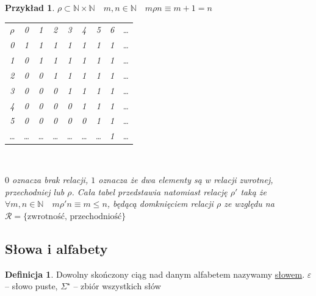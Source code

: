 \documentclass[12pt,a4paper]{article}
\newtheorem{przyklad}{Przykład}
\theoremstyle{definition}
\newtheorem{df}{Definicja}
\theoremstyle{remark}
\begin{document}
\begin{przyklad}
	$\rho \subset \mathbb{N}\times\mathbb{N} \quad m,n \in \mathbb{N} \quad m\rho n \equiv m +1 = n$ \\
	\begin{center}
	\begin{tabular}{ccccccccc}
		$\rho$ & 0 & 1 & 2 & 3 & 4 & 5 & 6 & \dots \\
			0  & {\color{red}1} & {\color{blue}1} & {\color{green}1}  & {\color{green}1}  & {\color{green}1}  & {\color{green}1}  & {\color{green}1}  & \dots \\
			1  & {\color{yellow}0}  & {\color{red}1}  & {\color{blue}1} & {\color{green}1}  & {\color{green}1}  & {\color{green}1}  & {\color{green}1}  & \dots \\
			2  & {\color{yellow}0}  & {\color{yellow}0}  & {\color{red}1}  & {\color{blue}1} & {\color{green}1}  &  {\color{green}1} & {\color{green}1}  & \dots \\
			3  & {\color{yellow}0}  & {\color{yellow}0}  & {\color{yellow}0}  & {\color{red}1}  & {\color{blue}1} & {\color{green}1}  & {\color{green}1}  & \dots \\
			4  & {\color{yellow}0}  & {\color{yellow}0}  & {\color{yellow}0}  & {\color{yellow}0}  & {\color{red}1}  & {\color{blue}1} & {\color{green}1}  & \dots \\
			5  & {\color{yellow}0}  & {\color{yellow}0}  & {\color{yellow}0}  & {\color{yellow}0}  & {\color{yellow}0}  & {\color{red}1}  & {\color{blue}1} & \dots \\
	     \dots & \dots  & \dots  & \dots  & \dots  & \dots  & \dots  & {\color{red}1}  & \dots \\
	\end{tabular}\\
	\end{center}	
	{\color{yellow} $0$ oznacza brak relacji}, $1$ oznacza że dwa elementy są w relacji {\color{red}zwrotnej}, {\color{green}przechodniej} lub {\color{blue}$\rho$}. 
	Cała tabel przedstawia natomiast relację $\rho'$ taką że $\forall m,n \in \mathbb{N} \quad m \rho' n \equiv m \leqslant n$,  będącą domknięciem relacji $\rho$ ze względu na 
	$\mathcal{R} = \{\text{zwrotność, przechodniość}\}$
\end{przyklad}

\subsection{Słowa i alfabety}
	\begin{df}
		Dowolny skończony ciąg nad danym alfabetem nazywamy \href{http://pl.wikipedia.org/wiki/S%C5%82owo_(matematyka)}{słowem}.
		 $\varepsilon$ -- słowo puste, $\Sigma^\star$ -- zbiór wszystkich słów
	\end{df}
	
\end{document}
